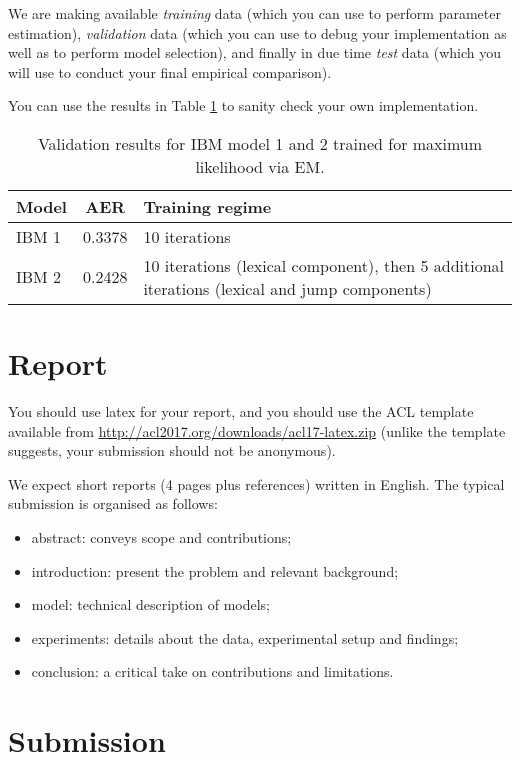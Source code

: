 We are making available \emph{training} data (which you can use to perform parameter estimation), \emph{validation} data (which you can use to debug your implementation as well as to perform model selection), and finally in due time \emph{test} data (which you will use to conduct your final empirical comparison).

You can use the results in Table \ref{tab:validation} to sanity check your own implementation.

\begin{table}\centering
\begin{tabular}{l | c | p{10cm}}
\bf Model & \bf AER & \bf Training regime \\ \hline
IBM 1 & 0.3378 & 10 iterations \\
IBM 2 & 0.2428 & 10 iterations (lexical component), then 5 additional iterations (lexical and jump components) \\ \hline
\end{tabular}
\caption{\label{tab:validation}Validation results for IBM model 1 and 2 trained for maximum likelihood via EM.}
\end{table}

\section{Report}

You should use latex for your report, and you should use the ACL template available from \url{http://acl2017.org/downloads/acl17-latex.zip} (unlike the template suggests, your submission should not be anonymous). 

We expect short reports (4 pages plus references) written in English. The typical submission is organised as follows: 
\begin{itemize}
	\item abstract: conveys scope and contributions;
	\item introduction: present the problem and relevant background;
	\item model: technical description of models;
	\item experiments: details about the data, experimental setup and findings;
	\item conclusion: a critical take on contributions and limitations.
\end{itemize}


\section{Submission}


